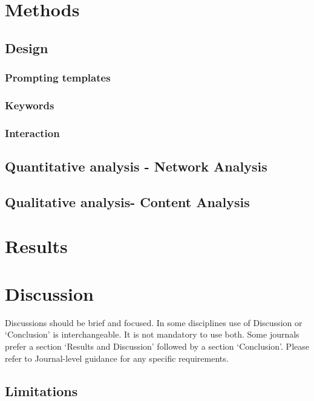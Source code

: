 \documentclass[sn-mathphys, Numbered]{sn-jnl}%
\theoremstyle{thmstyleone}%
\theoremstyle{thmstyletwo}%
\theoremstyle{thmstylethree}%
\begin{document}
\section{Methods}\label{Methods}

\subsection{Design}\label{Interaction design}
\subsubsection{Prompting templates}
\subsubsection{Keywords}
\subsubsection{Interaction}

\subsection{Quantitative analysis - Network Analysis}\label{Quantitative Analysis}

\subsection{Qualitative analysis- Content Analysis}\label{Qualitative Analysis}



\section{Results}\label{Results}

\section{Discussion}\label{Discussion}

Discussions should be brief and focused. In some disciplines use of Discussion or `Conclusion' is interchangeable. It is not mandatory to use both. Some journals prefer a section `Results and Discussion' followed by a section `Conclusion'. Please refer to Journal-level guidance for any specific requirements. 


\subsection{Limitations}\label{Limitations}
\end{document}
